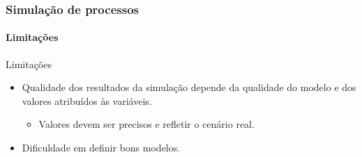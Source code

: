 \begin{frame}
	\frametitle{Simulação de processos}
	\framesubtitle{Limitações}
	
	\begin{block:fact}{Limitações}
		\begin{itemize}
			\item Qualidade dos resultados da simulação depende da qualidade do modelo
			e dos valores atribuídos às variáveis.
			\begin{itemize}
				\item Valores devem ser precisos e refletir o cenário real.
			\end{itemize}
			
			\item Dificuldade em definir bons modelos.
		\end{itemize}
	\end{block:fact}
\end{frame}
